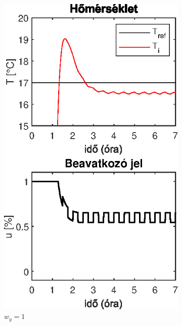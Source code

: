 \begin{figure}[H]
	\begin{subfigure}[t]{0.32\textwidth}
		\centering
		\includegraphics[width=\textwidth]{figures/realsys/mpc-wy-1}
		\caption{$w_y=1$}
		\label{fig:mpc-wy-1}
	\end{subfigure}
	~
	\begin{subfigure}[t]{0.32\textwidth}
		\centering

\end{subfigure}
\end{figure}
